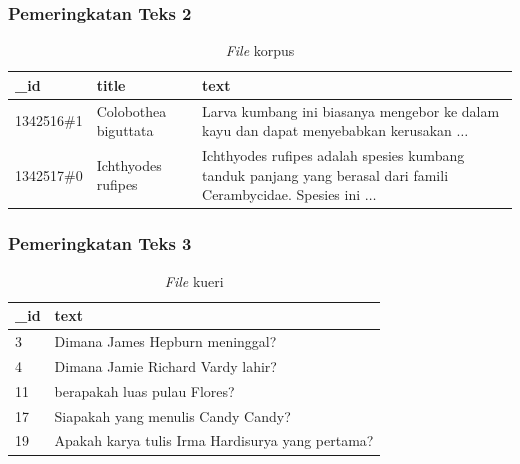 \documentclass{beamer}
\newcommand{\f}[1]{\textit{#1}}
\begin{document}
\begin{frame}
    \frametitle{Pemeringkatan Teks 2}
    \begin{table}[!ht]
        \centering
        \label{tab:contoh-file-korpus}
        \caption{\f{File} korpus}
        \begin{tabular}{|l|l|p{}|}
            \hline
            \textbf{\_id}    & \textbf{title}             & \textbf{text}                                                                                                 \\ \hline
            1342516\#1  & Colobothea biguttata & Larva kumbang ini biasanya mengebor ke dalam kayu dan dapat menyebabkan kerusakan $\dots$ \\ \hline
            1342517\#0  & Ichthyodes rufipes  & Ichthyodes rufipes adalah spesies kumbang tanduk panjang yang berasal dari famili Cerambycidae. Spesies ini $\dots$ \\ \hline
        \end{tabular}
    \end{table}
\end{frame}


\begin{frame}
\frametitle{Pemeringkatan Teks 3}

    \begin{table}[!ht]
        \centering
        \caption{\f{File} kueri}
        \label{tab:query-file-example}
        \begin{tabular}{|l|p{}|}
            \hline
            \textbf{\_id} & \textbf{text}                                                                 \\ \hline
            3             & Dimana James Hepburn meninggal?                                              \\ \hline
            4             & Dimana Jamie Richard Vardy lahir?                                            \\ \hline
            11            & berapakah luas pulau Flores?                                                 \\ \hline
            17            & Siapakah yang menulis Candy Candy?                                           \\ \hline
            19            & Apakah karya tulis Irma Hardisurya yang pertama?                              \\ \hline
        \end{tabular}
    \end{table}
\end{frame}
\end{document}
